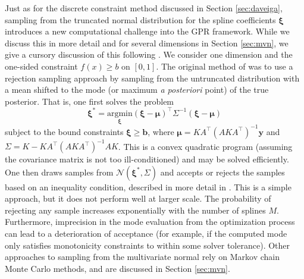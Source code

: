 \label{sec:spline_sampling}
Just as for the discrete constraint method discussed in Section \ref{sec:daveiga}, sampling from the truncated normal distribution for the spline coefficients $\bm{\xi}$ introduces a new computational challenge into the GPR framework. While we discuss this in more detail and for several dimensions in Section \ref{sec:mvn}, we give a cursory discussion of this following . We consider one dimension and the one-sided constraint $f(x) \ge b$ on $[0,1]$.
The original method of  was to use a rejection sampling approach by sampling from the untruncated 
distribution with a mean shifted to the mode (or maximum \emph{a posteriori} point) of the true posterior. That is, one first solves the problem
\begin{equation}\label{eq:posterior_mode}
\bm{\xi}^* = \underset{\bm{\xi}}{\text{argmin}}(\bm{\xi}-\bm{\mu})^\top\Sigma^{-1}(\bm{\xi}-\bm{\mu})
\end{equation}
subject to the bound constraints $\bm{\xi} \geq \mathbf{b}$,
where $\bm{\mu} = KA^\top (AKA^\top)^{-1} \mathbf{y}$ and $\Sigma = K-KA^\top(AKA^\top)^{-1}AK$. This is a convex quadratic program (assuming the covariance matrix is not too ill-conditioned) and may be solved efficiently.
One then draws samples from $\mathcal{N}(\bm{\xi}^*,\Sigma)$ and accepts or rejects the samples based on an inequality condition, described in more detail in .  
This is a simple approach, but it does not perform well at larger scale. The probability of rejecting any sample increases exponentially with the number of splines $M$. Furthermore, imprecision in the mode evaluation from the optimization process can lead to a deterioration of acceptance (for example, if the computed mode only satisfies monotonicity constraints to within some solver tolerance). 
Other approaches to sampling from the multivariate normal rely on Markov chain Monte Carlo methods, and are discussed in Section \ref{sec:mvn}.

